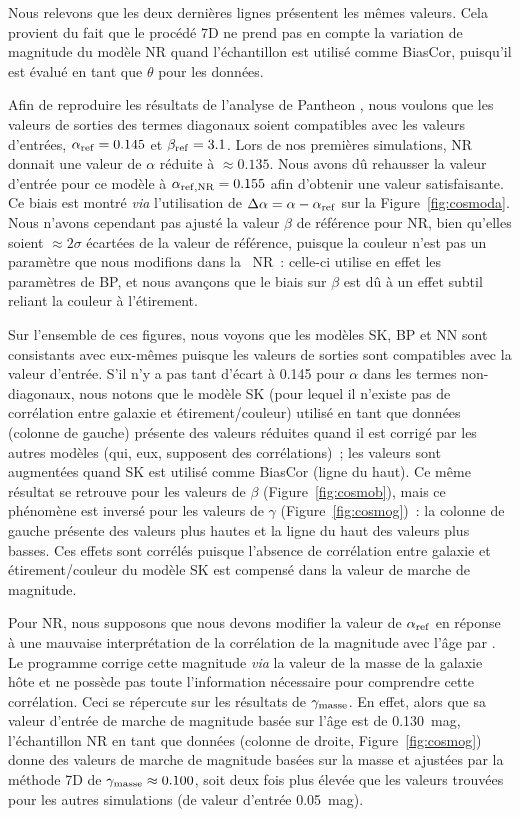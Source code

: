 \documentclass[../main/main.tex]{subfiles}
\begin{document}
Nous relevons que les deux dernières lignes présentent les mêmes valeurs. Cela
provient du fait que le procédé \bbc7D ne prend pas en compte la variation de
magnitude du modèle NR quand l'échantillon est utilisé comme BiasCor, puisqu'il
est évalué en tant que $\theta$ pour les données.

Afin de reproduire les résultats de l'analyse de Pantheon \citep{scolnic2018},
nous voulons que les valeurs de sorties des termes diagonaux soient compatibles
avec les valeurs d'entrées, $\alpha_{\rm ref} = \num{0.145}$ et $\beta_{\rm ref}
= \num{3.1}$. Lors de nos premières simulations, NR donnait une valeur de
$\alpha$ réduite à $\approx \num{0.135}$. Nous avons dû rehausser la valeur
d'entrée pour ce modèle à $\alpha_{\rm ref, NR} = \num{0.155}$ afin d'obtenir
une valeur satisfaisante. Ce biais est montré \textit{via} l'utilisation de
$\Delta\alpha = \alpha - \alpha_{\rm ref}$ sur la Figure~\ref{fig:cosmoda}. Nous
n'avons cependant pas ajusté la valeur $\beta$ de référence pour NR, bien
qu'elles soient $\approx 2\sigma$ écartées de la valeur de référence, puisque la
couleur n'est pas un paramètre que nous modifions dans la \hostlib\ NR~:
celle-ci utilise en effet les paramètres de BP, et nous avançons que le biais
sur $\beta$ est dû à un effet subtil reliant la couleur à l'étirement.

Sur l'ensemble de ces figures, nous voyons que les modèles SK, BP et NN sont
consistants avec eux-mêmes puisque les valeurs de sorties sont compatibles avec
la valeur d'entrée. S'il n'y a pas tant d'écart à \num{0.145} pour $\alpha$ dans
les termes non-diagonaux, nous notons que le modèle SK (pour lequel il n'existe
pas de corrélation entre galaxie et étirement/couleur) utilisé en tant que
données (colonne de gauche) présente des valeurs réduites quand il est corrigé
par les autres modèles (qui, eux, supposent des corrélations)~;  les valeurs
sont augmentées quand SK est utilisé comme BiasCor (ligne du haut). Ce même
résultat se retrouve pour les valeurs de $\beta$ (Figure~\ref{fig:cosmob}),
mais ce phénomène est inversé pour les valeurs de $\gamma$
(Figure~\ref{fig:cosmog})~: la colonne de gauche présente des valeurs plus
hautes et la ligne du haut des valeurs plus basses. Ces effets sont corrélés
puisque l'absence de corrélation entre galaxie et étirement/couleur du modèle SK
est compensé dans la valeur de marche de magnitude.

Pour NR, nous supposons que nous devons modifier la valeur de $\alpha_{\rm ref}$
en réponse à une mauvaise interprétation de la corrélation de la magnitude avec
l'âge par \snana. Le programme corrige cette magnitude \textit{via} la valeur de
la masse de la galaxie hôte et ne possède pas toute l'information nécessaire
pour comprendre cette corrélation. Ceci se répercute sur les résultats de
$\gamma_{\rm masse}$. En effet, alors que sa valeur d'entrée de marche de
magnitude basée sur l'âge est de \SI{0.130}{mag}, l'échantillon NR en tant que
données (colonne de droite, Figure~\ref{fig:cosmog}) donne des valeurs de marche
de magnitude basées sur la masse et ajustées par la méthode \bbc7D de
$\gamma_{\rm masse} \approx \num{.100}$, soit deux fois plus élevée que les
valeurs trouvées pour les autres simulations (de valeur d'entrée
\SI{0.05}{mag}).
\end{document}
